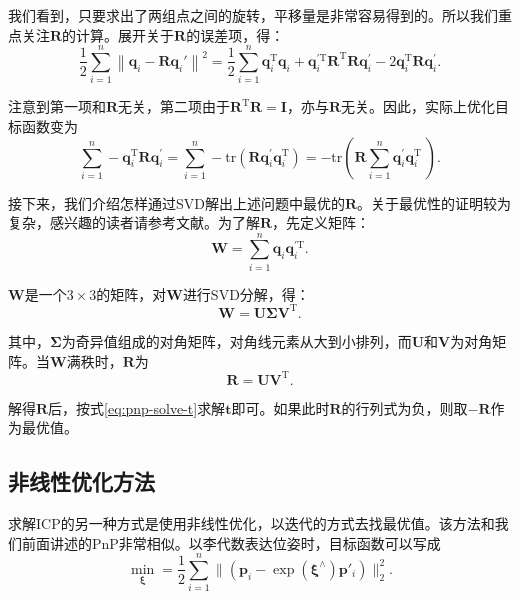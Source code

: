 我们看到，只要求出了两组点之间的旋转，平移量是非常容易得到的。所以我们重点关注$\bm{R}$的计算。展开关于$\bm{R}$的误差项，得：
\begin{equation}
 \frac{1}{2}\sum\limits_{i = 1}^n \left\| {{\bm{q}_i} - \bm{R} \bm{q}_i' } \right\|^2 = \frac{1}{2}\sum\limits_{i = 1}^n \bm{q}_i^\mathrm{T} \bm{q}_i + \bm{q}_i^{ \prime \mathrm{T}}  \bm{R}^\mathrm{T} \bm{R} \bm{q}^\prime_i - 2\bm{q}_i^\mathrm{T} \bm{R} \bm{q}^\prime_i.
\end{equation}

注意到第一项和$\bm{R}$无关，第二项由于$\bm{R}^\mathrm{T}\bm{R}=\bm{I}$，亦与$\bm{R}$无关。因此，实际上优化目标函数变为
\begin{equation}
\sum\limits_{i = 1}^n - \bm{q}_i^\mathrm{T} \bm{R} \bm{q}^\prime_i = \sum\limits_{i = 1}^n -\mathrm{tr} \left( \bm{R} \bm{q}_i^{\prime} \bm{q}^{\mathrm{T}}_i \right) = - \mathrm{tr} \left( \bm{R} \sum\limits_{i = 1}^n \bm{q}_i^{\prime} \bm{q}^{\mathrm{T}}_i \ \right).
\end{equation}

接下来，我们介绍怎样通过SVD解出上述问题中最优的$\bm{R}$。关于最优性的证明较为复杂，感兴趣的读者请参考文献\cite{Arun1987, PomerleauColasSiegwart2015}。为了解$\bm{R}$，先定义矩阵：
\begin{equation}
\bm{W} =  \sum\limits_{i = 1}^n \bm{q}_i \bm{q}^{\prime \mathrm{T}}_i.
\end{equation}

$\bm{W}$是一个$3 \times 3$的矩阵，对$\bm{W}$进行SVD分解，得：
\begin{equation}
\bm{W} = \bm{U \Sigma V}^\mathrm{T}.
\end{equation}

其中，$\bm{\Sigma}$为奇异值组成的对角矩阵，对角线元素从大到小排列，而$\bm{U}$和$\bm{V}$为对角矩阵。当$\bm{W}$满秩时，$\bm{R}$为
\begin{equation}
\bm{R} = \bm{U} \bm{V}^\mathrm{T}.
\end{equation}

解得$\bm{R}$后，按式\eqref{eq:pnp-solve-t}求解$\bm{t}$即可。如果此时$\bm{R}$的行列式为负，则取$-\bm{R}$作为最优值。

\subsection{非线性优化方法}
求解ICP的另一种方式是使用非线性优化，以迭代的方式去找最优值。该方法和我们前面讲述的PnP非常相似。以李代数表达位姿时，目标函数可以写成
\begin{equation}
\mathop {\min }\limits_{\boldsymbol{\xi}} = \frac{1}{2} \sum\limits_{i = 1}^n\| {\left( {{{\bm{p}}_i} - \exp \left( \boldsymbol{\xi}^\wedge \right) {\bm{p}}'_i} \right)} \|^2_2.
\end{equation}

